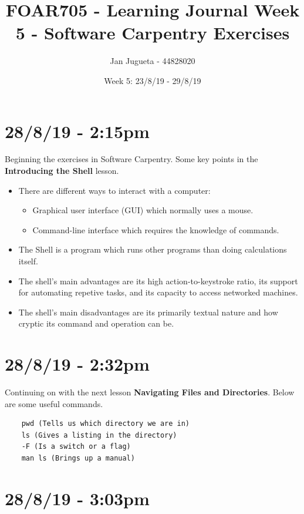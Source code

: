 \documentclass{article}
\title{FOAR705 - Learning Journal Week 5 - Software Carpentry Exercises}
\author{Jan Jugueta - 44828020}
\date{Week 5: 23/8/19 - 29/8/19}
\begin{document}
\maketitle

\section*{28/8/19 - 2:15pm}

Beginning the exercises in Software Carpentry. Some key points in the \textbf{Introducing the Shell} lesson.

\begin{itemize}
    \item There are different ways to interact with a computer:
    \begin{itemize}
        \item Graphical user interface (GUI) which normally uses a mouse.
        \item Command-line interface which requires the knowledge of commands.
    \end{itemize}
    \item The Shell is a program which runs other programs than doing calculations itself.
    \item The shell's main advantages are its high action-to-keystroke ratio, its support for automating repetive tasks, and its capacity to access networked machines.
    \item The shell's main disadvantages are its primarily textual nature and how cryptic its command and operation can be.
\end{itemize}

\section*{28/8/19 - 2:32pm}

Continuing on with the next lesson \textbf{Navigating Files and Directories}. Below are some useful commands.

\begin{verbatim}
    pwd (Tells us which directory we are in)
    ls (Gives a listing in the directory)
    -F (Is a switch or a flag)
    man ls (Brings up a manual)
\end{verbatim} 

\section*{28/8/19 - 3:03pm}
\end{document}

